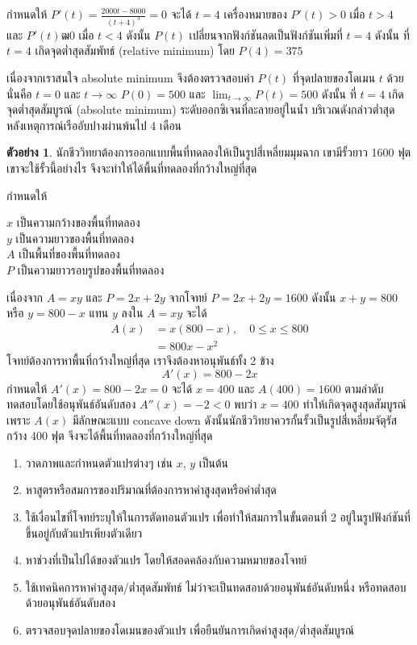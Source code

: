 \documentclass[
]{book}
\theoremstyle{definition}
\theoremstyle{definition}
\newtheorem{example}{ตัวอย่าง}[chapter]
\theoremstyle{definition}
\theoremstyle{definition}
\theoremstyle{remark}
\begin{document}
กำหนดให้ \(\displaystyle P'(t)= \frac{2000t-8000}{(t+4)^3}=0\) จะได้ \(t=4\)
เครื่องหมายของ \(P'(t) > 0\) เมื่อ \(t > 4\) และ \(P'(t) ฒ 0\) เมื่อ \(t < 4\) ดังนั้น
\(P(t)\) เปลี่ยนจากฟังก์ชันลดเป็นฟังก์ชันเพิ่มที่ \(t=4\) ดังนั้น ที่ \(t=4\) เกิดจุดต่ำสุดสัมพัทธ์
(relative minimum) โดย \(P(4)=375\)

เนื่องจากเราสนใจ absolute minimum จึงต้องตรวจสอบค่า \(P(t)\) ที่จุดปลายของโดเมน
\(t\) ด้วย นั่นคือ \(t = 0\) และ \(t \rightarrow \infty\) \(P(0)=500\) และ
\(\lim_{t \rightarrow \infty} P(t) = 500\) ดังนั้น ที่ \(t=4\) เกิดจุดต่ำสุดสัมบูรณ์
(absolute minimum) ระดับออกซิเจนที่ละลายอยู่ในน้ำ บริเวณดังกล่าวต่ำสุด
หลังเหตุการณ์เรืออับปางผ่านพ้นไป 4 เดือน

\begin{example}
นักชีววิทยาต้องการออกแบบพื้นที่ทดลองให้เป็นรูปสี่เหลี่ยมมุมฉาก เขามีรั้วยาว 1600 ฟุต
เขาจะใช้รั้วนี้อย่างไร จึงจะทำให้ได้พื้นที่ทดลองที่กว้างใหญ่ที่สุด
\end{example}

กำหนดให้

\(x\) เป็นความกว้างของพื้นที่ทดลอง\\
\(y\) เป็นความยาวของพื้นที่ทดลอง\\
\(A\) เป็นพื้นที่ของพื้นที่ทดลอง\\
\(P\) เป็นความยาวรอบรูปของพื้นที่ทดลอง

เนื่องจาก \(A=xy\) และ \(P=2x+2y\) จากโจทย์ \(P=2x+2y=1600\) ดังนั้น \(x+y=800\) หรือ
\(y=800-x\) แทน \(y\) ลงใน \(A=xy\) จะได้ \begin{equation}   \begin{aligned}
    A(x)  &=x(800-x), \quad  0 \le x \le 800 \\
            &=800x-x^2
  \end{aligned} \end{equation} โจทย์ต้องการหาพื้นที่กว้างใหญ่ที่สุด
เราจึงต้องหาอนุพันธ์ทั้ง 2 ข้าง \[A'(x)=800-2x\] กำหนดให้ \(A'(x)=800-2x=0\) จะได้
\(x=400\) และ \(A(400)=1600\) ตามลำดับ ทดสอบโดยใช้อนุพันธ์อันดับสอง \(A''(x)=-2<0\)
พบว่า \(x=400\) ทำให้เกิดจุดสูงสุดสัมบูรณ์ เพราะ \(A(x)\) มีลักษณะแบบ concave down
ดังนั้นนักชีววิทยาควรกั้นรั้วเป็นรูปสี่เหลี่ยมจัตุรัสกว้าง 400 ฟุต จึงจะได้พื้นที่ทดลองที่กว้างใหญ่ที่สุด

\begin{enumerate}
\def\labelenumi{\arabic{enumi}.}
\item
  วาดภาพและกำหนดตัวแปรต่างๆ เช่น \(x\), \(y\) เป็นต้น
\item
  หาสูตรหรือสมการของปริมาณที่ต้องการหาค่าสูงสุดหรือค่าต่ำสุด
\item
  ใช้เงื่อนไขที่โจทย์ระบุให้ในการตัดทอนตัวแปร เพื่อทำให้สมการในขั้นตอนที่ 2
  อยู่ในรูปฟังก์ชันที่ขึ้นอยู่กับตัวแปรเพียงตัวเดียว
\item
  หาช่วงที่เป็นไปได้ของตัวแปร โดยให้สอดคล้องกับความหมายของโจทย์
\item
  ใช้เทคนิคการหาค่าสูงสุด/ต่ำสุดสัมพัทธ์ ไม่ว่าจะเป็นทดสอบด้วยอนุพันธ์อันดับหนึ่ง
  หรือทดสอบด้วยอนุพันธ์อันดับสอง
\item
  ตรวจสอบจุดปลายของโดเมนของตัวแปร เพื่อยืนยันการเกิดค่าสูงสุด/ต่ำสุดสัมบูรณ์
\end{enumerate}
\end{document}
